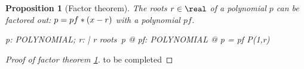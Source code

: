 \documentclass[12pt]{scrartcl}
\newtheorem{prop}{Proposition}[section]
\begin{document}
\begin{prop}[Factor theorem]
  \label{prop:factor-theorem}
  The roots $r \in \real$ of a polynomial $p$ can be factored out: $p
  = pf * (x-r)$ with a polynomial $pf$.
  \begin{zed}
    \forall p: POLYNOMIAL; r: \real | r \in roots~p @ \exists pf: POLYNOMIAL @ p =
    pf \polymult P(1,r)
  \end{zed}
\end{prop}
\begin{proof}[Proof of factor theorem \ref{prop:factor-theorem}]
  to be completed
\end{proof}
% 
\printbibliography{}

\end{document}

